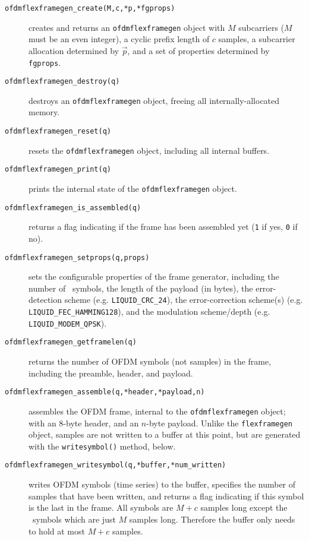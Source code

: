 \begin{description}
%
\item[{\tt ofdmflexframegen\_create(M,c,*p,*fgprops)}]
    creates and returns an {\tt ofdmflexframegen} object
    with $M$ subcarriers ($M$ must be an even integer),
    a cyclic prefix length of $c$ samples,
    a subcarrier allocation determined by $\vec{p}$,
    and a set of properties determined by {\tt fgprops}.
%
\item[{\tt ofdmflexframegen\_destroy(q)}]
    destroys an {\tt ofdmflexframegen} object, freeing all
    internally-allocated memory.
%
\item[{\tt ofdmflexframegen\_reset(q)}]
    resets the {\tt ofdmflexframegen} object, including all internal
    buffers.
%
\item[{\tt ofdmflexframegen\_print(q)}]
    prints the internal state of the {\tt ofdmflexframegen} object.
%
\item[{\tt ofdmflexframegen\_is\_assembled(q)}]
    returns a flag indicating if the frame has been assembled yet
    ({\tt 1} if yes, {\tt 0} if no).
%
\item[{\tt ofdmflexframegen\_setprops(q,props)}]
    sets the configurable properties of the frame generator, including
    the number of \Ss\ symbols,
    the length of the payload (in bytes),
    the error-detection scheme (e.g. {\tt LIQUID\_CRC\_24}),
    the error-correction scheme(s) (e.g. {\tt LIQUID\_FEC\_HAMMING128}),
    and the modulation scheme/depth (e.g. {\tt LIQUID\_MODEM\_QPSK}).
%
\item[{\tt ofdmflexframegen\_getframelen(q)}]
    returns the number of OFDM symbols (not samples) in the frame,
    including the preamble, header, and payload.
%
\item[{\tt ofdmflexframegen\_assemble(q,*header,*payload,n)}]
    assembles the OFDM frame, internal to the {\tt ofdmflexframegen}
    object; with an 8-byte header, and an $n$-byte payload.
    Unlike the {\tt flexframegen} object, samples are not written to a
    buffer at this point, but are generated with the
    {\tt writesymbol()} method, below.
%
\item[{\tt ofdmflexframegen\_writesymbol(q,*buffer,*num\_written)}]
    writes OFDM symbols (time series) to the buffer, specifies the
    number of samples that have been written, and returns a flag
    indicating if this symbol is the last in the frame.
    All symbols are $M+c$ samples long except the \Ss\ symbols which are
    just $M$ samples long.
    Therefore the buffer only needs to hold at most $M+c$ samples.
%
\end{description}


